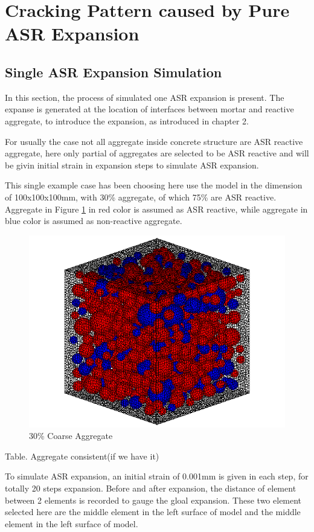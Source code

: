 \clearpage
\section{Cracking Pattern caused by Pure ASR Expansion}


\subsection{Single ASR Expansion Simulation}


In this section, the process of simulated one ASR expansion is present. The expanse is generated at the location of interfaces between mortar and reactive aggregate, to introduce the expansion, as introduced in chapter 2.

For usually the case not all aggregate inside concrete structure are ASR reactive aggregate, here only partial of aggregates are selected to be ASR reactive and will be givin initial strain in expansion steps to simulate ASR expansion.

This single example case has been choosing here use the model in the dimension of 100x100x100mm, with 30\% aggregate, of which 75\% are ASR reactive. Aggregate in Figure \ref{fig:A30_model} in red color is assumed as ASR reactive, while aggregate in blue color is assumed as non-reactive aggregate.

  \begin{figure}[ht!]
  \centering
  \includegraphics[width=.3\linewidth]{Files/Aggregate/A30P75.png}
    \caption{30\% Coarse Aggregate}
    \label{fig:A30_model}
  \end{figure}

Table. Aggregate consistent(if we have it)

To simulate ASR expansion, an initial strain of 0.001mm is given in each step, for totally 20 steps expansion. Before and after expansion, the distance of element between 2 elements is recorded to gauge the gloal expansion. These two element selected here are the middle element in the left surface of model and the middle element in the left surface of model.

